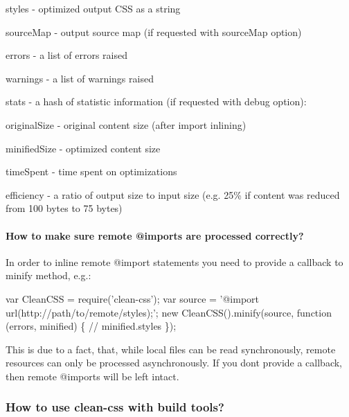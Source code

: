 \begin{DoxyItemize}
\item {\ttfamily styles} -\/ optimized output C\+SS as a string
\item {\ttfamily source\+Map} -\/ output source map (if requested with {\ttfamily source\+Map} option)
\item {\ttfamily errors} -\/ a list of errors raised
\item {\ttfamily warnings} -\/ a list of warnings raised
\item {\ttfamily stats} -\/ a hash of statistic information (if requested with {\ttfamily debug} option)\+:
\begin{DoxyItemize}
\item {\ttfamily original\+Size} -\/ original content size (after import inlining)
\item {\ttfamily minified\+Size} -\/ optimized content size
\item {\ttfamily time\+Spent} -\/ time spent on optimizations
\item {\ttfamily efficiency} -\/ a ratio of output size to input size (e.\+g. 25\% if content was reduced from 100 bytes to 75 bytes)
\end{DoxyItemize}
\end{DoxyItemize}

\paragraph*{How to make sure remote {\ttfamily @import}s are processed correctly?}

In order to inline remote {\ttfamily @import} statements you need to provide a callback to minify method, e.\+g.\+:


\begin{DoxyCode}
var CleanCSS = require('clean-css');
var source = '@import url(http://path/to/remote/styles);';
new CleanCSS().minify(source, function (errors, minified) \{
  // minified.styles
\});
\end{DoxyCode}


This is due to a fact, that, while local files can be read synchronously, remote resources can only be processed asynchronously. If you don\textquotesingle{}t provide a callback, then remote {\ttfamily @import}s will be left intact.

\subsubsection*{How to use clean-\/css with build tools?}


